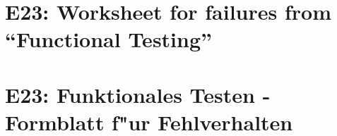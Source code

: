 
\thispagestyle{empty}
\ifenglish
\section*{E23: Worksheet for failures from ``Functional Testing''}

\fi
\ifgerman
\section*{E23: Funktionales Testen - Formblatt f"ur Fehlverhalten}

\fi

